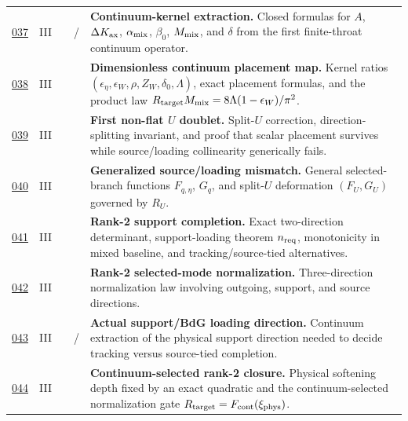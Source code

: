 {\begin{longtable}{@{}L{0.055\textwidth}L{0.075\textwidth}L{0.145\textwidth}L{0.235\textwidth}L{0.43\textwidth}@{}}
\addlinespace
\hyperref[stage:037]{037} & III &  & \StatusExactClosure{} / \StatusReduced{} & \textbf{Continuum-kernel extraction.} Closed formulas for \(A\), \(\Delta K_{\rm ax}\), \(\alpha_{\rm mix}\), \(\beta_0\), \(M_{\rm mix}\), and \(\delta\) from the first finite-throat continuum operator. \\
\addlinespace
\hyperref[stage:038]{038} & III &  & \StatusExactClosure{} & \textbf{Dimensionless continuum placement map.} Kernel ratios \((\epsilon_\eta,\epsilon_W,\rho,Z_W,\delta_0,\Lambda)\), exact placement formulas, and the product law \(R_{\rm target}M_{\rm mix}=8\Lambda(1-\epsilon_W)/\pi^2\). \\
\addlinespace
\hyperref[stage:039]{039} & III &  & \StatusExactClosure{} & \textbf{First non-flat \(U\) doublet.} Split-\(U\) correction, direction-splitting invariant, and proof that scalar placement survives while source/loading collinearity generically fails. \\
\addlinespace
\hyperref[stage:040]{040} & III &  & \StatusExactClosure{} & \textbf{Generalized source/loading mismatch.} General selected-branch functions \(F_{q,\eta}\), \(G_q\), and split-\(U\) deformation \((F_U,G_U)\) governed by \(R_U\). \\
\addlinespace
\hyperref[stage:041]{041} & III &  & \StatusExactClosure{} & \textbf{Rank-2 support completion.} Exact two-direction determinant, support-loading theorem \(n_{\rm req}\), monotonicity in mixed baseline, and tracking/source-tied alternatives. \\
\addlinespace
\hyperref[stage:042]{042} & III &  & \StatusExactClosure{} & \textbf{Rank-2 selected-mode normalization.} Three-direction normalization law involving outgoing, support, and source directions. \\
\addlinespace
\hyperref[stage:043]{043} & III &  & \StatusReduced{} / \StatusExactClosure{} & \textbf{Actual support/BdG loading direction.} Continuum extraction of the physical support direction needed to decide tracking versus source-tied completion. \\
\addlinespace
\hyperref[stage:044]{044} & III &  & \StatusExactClosure{} & \textbf{Continuum-selected rank-2 closure.} Physical softening depth fixed by an exact quadratic and the continuum-selected normalization gate \(R_{\rm target}=F_{\rm cont}(\xi_{\rm phys})\). \\

\end{longtable}}
